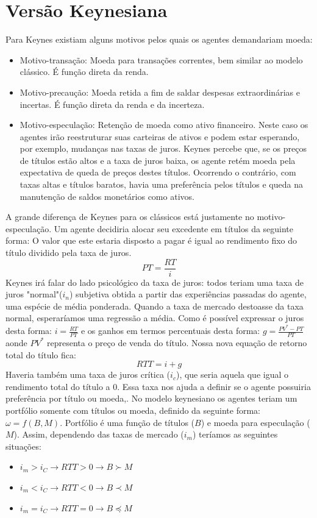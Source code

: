 \documentclass[12pt,a4paper,oneside,brazil]{abntex2}
\begin{document}
\section{Versão Keynesiana}
Para Keynes existiam alguns motivos pelos quais os agentes demandariam moeda:
\begin{itemize}
\item Motivo-transação: Moeda para transações correntes, bem similar ao modelo clássico. É função direta da renda.
\item Motivo-precaução: Moeda retida a fim de saldar despesas extraordinárias e incertas. É função direta da renda e da incerteza.
\item Motivo-especulação: Retenção de moeda como ativo financeiro. Neste caso os agentes irão reestruturar suas carteiras de ativos e podem estar esperando, por exemplo, mudanças nas taxas de juros. Keynes percebe que, se os preços de títulos estão altos e a taxa de juros baixa, os agente retém moeda pela expectativa de queda de preços destes títulos. Ocorrendo o contrário, com taxas altas e títulos baratos, havia uma preferência pelos títulos e queda na manutenção de saldos monetários como ativos.
\end{itemize}
A grande diferença de Keynes para os clássicos está justamente no motivo-especulação. Um agente decidiria alocar seu excedente em títulos da seguinte forma: O valor que este estaria disposto a pagar é igual ao rendimento fixo do título dividido pela taxa de juros.
\[ PT = \frac{RT}{i}\]
Keynes irá falar do lado psicológico da taxa de juros: todos teriam uma taxa de juros "normal"($ i_n$) subjetiva obtida a partir das experiências passadas do agente, uma espécie de média ponderada. Quando a taxa de mercado destoasse da taxa normal, esperaríamos uma regressão a média.
Como é possível expressar o juros desta forma: $i = \frac{RT}{PT}$ e os ganhos em termos percentuais desta forma: $ g = \frac{PV^* - PT}{PT}$ aonde $PV^*$ representa o preço de venda do título. Nossa nova equação de retorno total do título fica:
\[ RTT = i + g\]
Haveria também uma taxa de juros crítica ($i_c$), que seria aquela que igual o rendimento total do título a 0. Essa taxa nos ajuda a definir se o agente possuiria preferência por título ou moeda,. No modelo keynesiano os agentes teriam um portfólio somente com títulos ou moeda, definido da seguinte forma: $ \omega =  f(B,M)$. Portfólio é uma função de títulos ($B$) e moeda para especulação ($M$).
Assim, dependendo das taxas de mercado ($i_m$) teríamos as seguintes situações:
\begin{itemize}
\item $i_m > i_C \rightarrow RTT > 0 \rightarrow B \succ M$
\item $i_m < i_C \rightarrow RTT < 0 \rightarrow B \prec M$
\item $i_m = i_C \rightarrow RTT = 0 \rightarrow B \preceq M$
\end{itemize}
\end{document}
